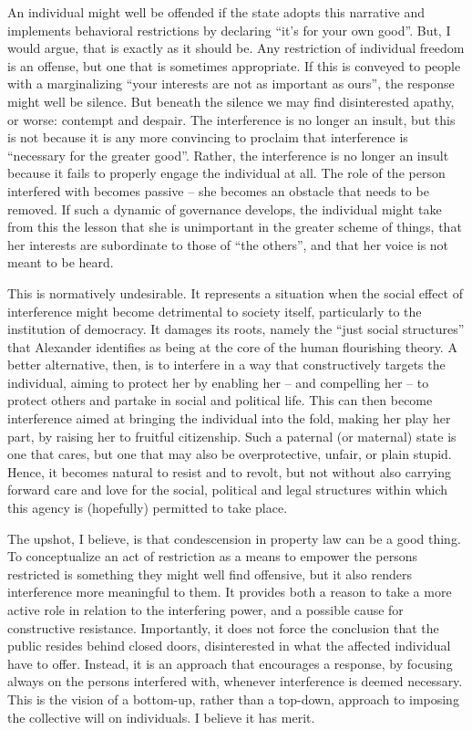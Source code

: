 An individual might well be offended if the state adopts this narrative and implements behavioral restrictions by declaring ``it's for your own good''. But, I would argue, that is exactly as it should be. Any restriction of individual freedom is an offense, but one that is sometimes appropriate. If this is conveyed to people with a marginalizing ``your interests are not as important as ours'', the response might well be silence. But beneath the silence we may find disinterested apathy, or worse: contempt and despair. The interference is no longer an insult, but this is not because it is any more convincing to proclaim that interference is ``necessary for the greater good''. Rather, the interference is no longer an insult because it fails to properly engage the individual at all. The role of the person interfered with becomes passive -- she becomes an obstacle that needs to be removed. If such a dynamic of governance develops, the individual might take from this the lesson that she is unimportant in the greater scheme of things, that her interests are subordinate to those of ``the others'', and that her voice is not meant to be heard.

This is normatively undesirable. It represents a situation when the social effect of interference might become detrimental to society itself, particularly to the institution of democracy. It damages its roots, namely the ``just social structures'' that Alexander identifies as being at the core of the human flourishing theory. A better alternative, then, is to interfere in a way that constructively targets the individual, aiming to protect her by enabling her -- and compelling her -- to protect others and partake in social and political life. This can then become interference aimed at bringing the individual into the fold, making her play her part, by raising her to fruitful citizenship. Such a paternal (or maternal) state is one that cares, but one that may also be overprotective, unfair, or plain stupid. Hence, it becomes natural to resist and to revolt, but not without also carrying forward care and love for the social, political and legal structures within which this agency is (hopefully) permitted to take place.

The upshot, I believe, is that condescension in property law can be a good thing. To conceptualize an act of restriction as a means to empower the persons restricted is something they might well find offensive, but it also renders interference more meaningful to them. It provides both a reason to take a more active role in relation to the interfering power, and a possible cause for constructive resistance. Importantly, it does not force the conclusion that the public resides behind closed doors, disinterested in what the affected individual have to offer. Instead, it is an approach that encourages a response, by focusing always on the persons interfered with, whenever interference is deemed necessary. This is the vision of a bottom-up, rather than a top-down, approach to imposing the collective will on individuals. I believe it has merit. 

